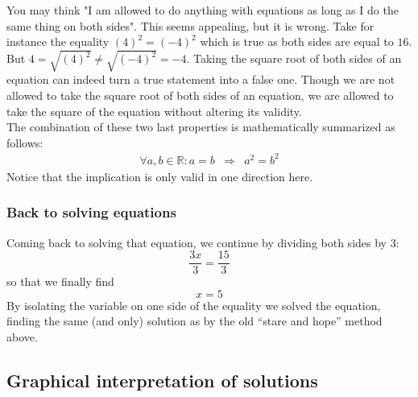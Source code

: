 \noindent You may think "I am allowed to do anything with equations as long as I do the same thing on both sides". This seems appealing, but it is wrong. Take for instance the equality $(4)^2 = (-4)^2$ which is true as both sides are equal to $16$. But $4 = \sqrt{(4)^2} \neq \sqrt{(-4)^2} = -4$. Taking the square root of both sides of an equation can indeed turn a true statement into a false one. Though we are not allowed to take the square root of both sides of an equation, we are allowed to take the square of the equation without altering its validity.\\

\noindent The combination of these two last properties is mathematically summarized as follows:
\begin{eqnarray*}
\forall a,b \in \mathbb{R}:a = b & \Rightarrow & a^2 = b^2
\end{eqnarray*}
Notice that the implication is only valid in one direction here. 

\subsubsection{Back to solving equations}

Coming back to solving that equation, we continue by dividing both sides by $3$:
$$
\frac{3x}{3} = \frac{15}{3}
$$
so that we finally find
$$
x = 5
$$
By isolating the variable on one side of the equality we solved the equation, finding the same (and only) solution as by the old "`stare and hope"' method above.\\

\subsection{Graphical interpretation of solutions}

